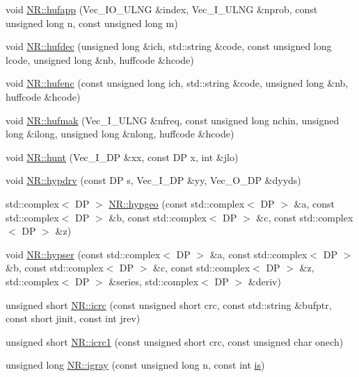 \begin{DoxyCompactItemize}
\item 
void \mbox{\hyperlink{namespaceNR_a55c1e21a90e38a4569ab763ec0a94515}{N\+R\+::hufapp}} (Vec\+\_\+\+I\+O\+\_\+\+U\+L\+NG \&index, Vec\+\_\+\+I\+\_\+\+U\+L\+NG \&nprob, const unsigned long n, const unsigned long m)
\item 
void \mbox{\hyperlink{namespaceNR_a2b3c3380b58a2d4cbf0c61f8bd444aec}{N\+R\+::hufdec}} (unsigned long \&ich, std\+::string \&code, const unsigned long lcode, unsigned long \&nb, huffcode \&hcode)
\item 
void \mbox{\hyperlink{namespaceNR_af74ccd5e55d8850e189e33cc374a6c5b}{N\+R\+::hufenc}} (const unsigned long ich, std\+::string \&code, unsigned long \&nb, huffcode \&hcode)
\item 
void \mbox{\hyperlink{namespaceNR_ae3369986daacfe65a679f2334cb53267}{N\+R\+::hufmak}} (Vec\+\_\+\+I\+\_\+\+U\+L\+NG \&nfreq, const unsigned long nchin, unsigned long \&ilong, unsigned long \&nlong, huffcode \&hcode)
\item 
void \mbox{\hyperlink{namespaceNR_a6bbdb382ae25b5c8c0baba1d48d848e1}{N\+R\+::hunt}} (Vec\+\_\+\+I\+\_\+\+DP \&xx, const DP x, int \&jlo)
\item 
void \mbox{\hyperlink{namespaceNR_a329631db0425541c0568938c22633e99}{N\+R\+::hypdrv}} (const DP s, Vec\+\_\+\+I\+\_\+\+DP \&yy, Vec\+\_\+\+O\+\_\+\+DP \&dyyds)
\item 
std\+::complex$<$ DP $>$ \mbox{\hyperlink{namespaceNR_a8666a2088d3699fe0bc7f14f0b51b5ed}{N\+R\+::hypgeo}} (const std\+::complex$<$ DP $>$ \&a, const std\+::complex$<$ DP $>$ \&b, const std\+::complex$<$ DP $>$ \&c, const std\+::complex$<$ DP $>$ \&z)
\item 
void \mbox{\hyperlink{namespaceNR_a5464226b1eb7a8ab468acb9d8194a5cb}{N\+R\+::hypser}} (const std\+::complex$<$ DP $>$ \&a, const std\+::complex$<$ DP $>$ \&b, const std\+::complex$<$ DP $>$ \&c, const std\+::complex$<$ DP $>$ \&z, std\+::complex$<$ DP $>$ \&series, std\+::complex$<$ DP $>$ \&deriv)
\item 
unsigned short \mbox{\hyperlink{namespaceNR_a05984f00dc053f5191e68179570e42f0}{N\+R\+::icrc}} (const unsigned short crc, const std\+::string \&bufptr, const short jinit, const int jrev)
\item 
unsigned short \mbox{\hyperlink{namespaceNR_a8eecd14f5dbacae9a1c719b3f8d5fe77}{N\+R\+::icrc1}} (const unsigned short crc, const unsigned char onech)
\item 
unsigned long \mbox{\hyperlink{namespaceNR_a4965006048ac8b1e627c9e21b9d6c1f8}{N\+R\+::igray}} (const unsigned long n, const int \mbox{\hyperlink{x_8cc_a81abbbdef81e25584a2eab888e643d3d}{is}})

\end{DoxyCompactItemize}
